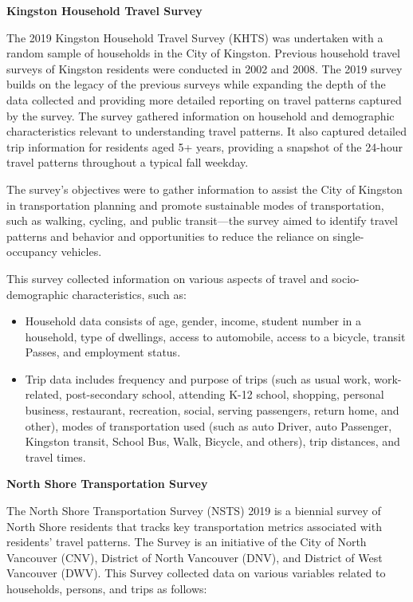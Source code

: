 \documentclass[
11pt, %
oneside, %
english, %
singlespacing, %
]{macthesis} %
\begin{document}
\textbf{Kingston Household Travel Survey}

The 2019 Kingston Household Travel Survey (KHTS) was undertaken with a random sample of households in the City of Kingston. Previous household travel surveys of Kingston residents were conducted in 2002 and 2008. The 2019 survey builds on the legacy of the previous surveys while expanding the depth of the data collected and providing more detailed reporting on travel patterns captured by the survey. The survey gathered information on household and demographic characteristics relevant to understanding travel patterns. It also captured detailed trip information for residents aged 5+ years, providing a snapshot of the 24-hour travel patterns throughout a typical fall weekday.

The survey's objectives were to gather information to assist the City of Kingston in transportation planning and promote sustainable modes of transportation, such as walking, cycling, and public transit---the survey aimed to identify travel patterns and behavior and opportunities to reduce the reliance on single-occupancy vehicles.

This survey collected information on various aspects of travel and socio-demographic characteristics, such as:

\begin{itemize}
\item
  Household data consists of age, gender, income, student number in a household, type of dwellings, access to automobile, access to a bicycle, transit Passes, and employment status.
\item
  Trip data includes frequency and purpose of trips (such as usual work, work-related, post-secondary school, attending K-12 school, shopping, personal business, restaurant, recreation, social, serving passengers, return home, and other), modes of transportation used (such as auto Driver, auto Passenger, Kingston transit, School Bus, Walk, Bicycle, and others), trip distances, and travel times.
\end{itemize}

\textbf{North Shore Transportation Survey}

The North Shore Transportation Survey (NSTS) 2019 is a biennial survey of North Shore residents that tracks key transportation metrics associated with residents' travel patterns. The Survey is an initiative of the City of North Vancouver (CNV), District of North Vancouver (DNV), and District of West Vancouver (DWV). This Survey collected data on various variables related to households, persons, and trips as follows:
\end{document}
